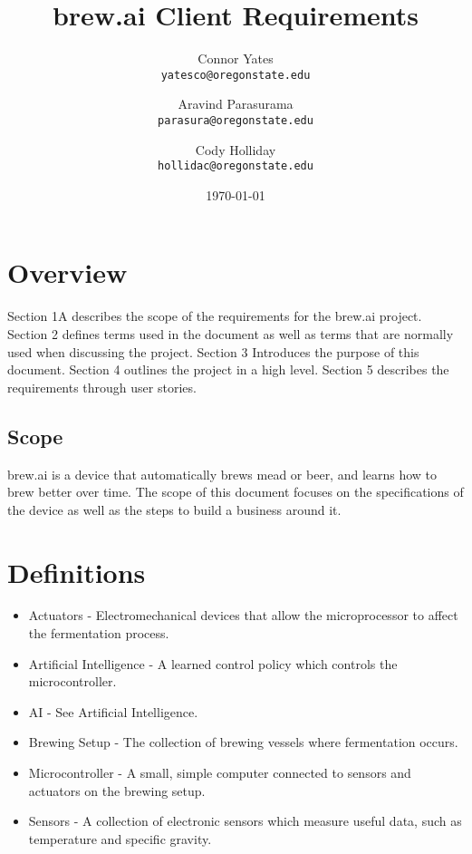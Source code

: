 \documentclass[draftclsnofoot,onecolumn,letterpaper,10pt]{IEEEtran}
\author{Connor Yates\\
\texttt{yatesco@oregonstate.edu\\}
\and
Aravind Parasurama\\
\texttt{parasura@oregonstate.edu\\}
\and
Cody Holliday\\
\texttt{hollidac@oregonstate.edu\\}}
\date{\today}
\title{brew.ai Client Requirements}
\begin{document}
\maketitle

\newpage
\tableofcontents
\newpage
\section{Overview}
Section 1A describes the scope of the requirements for the brew.ai project.
Section 2 defines terms used in the document as well as terms that are normally used when discussing the project.
Section 3 Introduces the purpose of this document.
Section 4 outlines the project in a high level.
Section 5 describes the requirements through user stories.

\subsection{Scope}
brew.ai is a device that automatically brews mead or beer, and learns how to brew better over time.
The scope of this document focuses on the specifications of the device as well 
as the steps to build a business around it.

\section{Definitions}
\begin{itemize}
	\item Actuators - Electromechanical devices that allow the microprocessor to 
		affect the fermentation process.
	\item Artificial Intelligence - A learned control policy which controls 
		the microcontroller.
	\item AI - See Artificial Intelligence.
	\item Brewing Setup - The collection of brewing vessels where fermentation 
		occurs.
	\item Microcontroller - A small, simple computer connected to sensors and 
		actuators on the brewing setup.
	\item Sensors - A collection of electronic sensors which measure useful data, 
		such as temperature and specific gravity.
\end{itemize}
\end{document}
